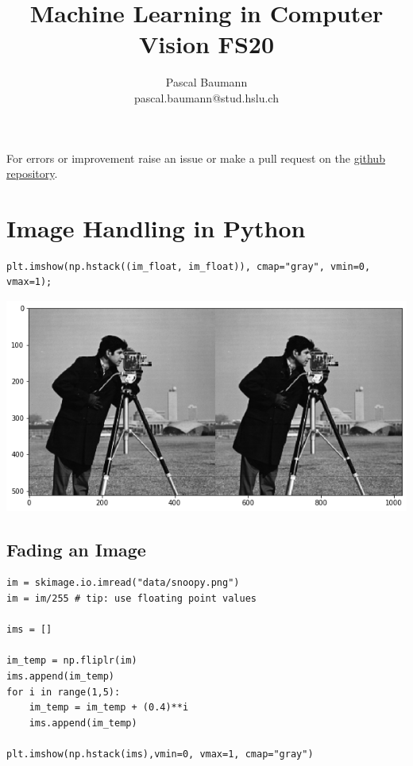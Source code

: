 \documentclass[11pt]{article}
\begin{document}
	
\title{Machine Learning in Computer Vision FS20}
\author{Pascal Baumann\\pascal.baumann@stud.hslu.ch}
\maketitle



For errors or improvement raise an issue or make a pull request on the \href{https://github.com/KilnOfTheSecondFlame/mse_summaries}{github repository}.

\tableofcontents
\newpage


\section{Image Handling in Python}

\begin{verbatim}
plt.imshow(np.hstack((im_float, im_float)), cmap="gray", vmin=0, vmax=1);
\end{verbatim}

\begin{center}
	\includegraphics[width=0.7\linewidth]{img/hstack_image}
\end{center}

\subsection{Fading an Image}

\begin{verbatim}
im = skimage.io.imread("data/snoopy.png")
im = im/255 # tip: use floating point values

ims = []

im_temp = np.fliplr(im)
ims.append(im_temp)
for i in range(1,5):
	im_temp = im_temp + (0.4)**i
	ims.append(im_temp)

plt.imshow(np.hstack(ims),vmin=0, vmax=1, cmap="gray")
\end{verbatim}
\end{document}
